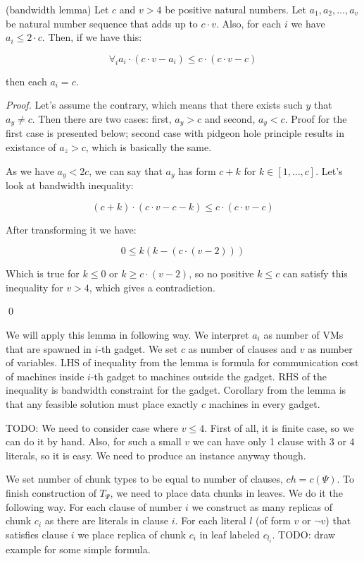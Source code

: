 \begin{lemma} (bandwidth lemma)
Let $c$ and $v > 4$ be positive natural numbers. Let $a_1, a_2, \ldots,
a_v$ be natural number sequence that adds up to $c \cdot v$. Also, for
each $i$ we have $a_i \leq 2 \cdot c$. Then, if we have this:

$$ \forall_i a_i \cdot (c \cdot v - a_i) \leq c \cdot (c \cdot v -
c) $$

then each $a_i = c$.
\end{lemma}
\begin{proof}

Let's assume the contrary, which means that there exists such $y$ that
$a_y \neq c$. Then there are two cases: first, $a_y>c$ and second,
$a_y<c$. Proof for the first case is presented below; second case
with pidgeon hole principle results in existance of $a_z > c$, which
is basically the same.

As we have $a_y < 2c$, we can say that $a_y$ has form $c +
k$ for $k \in [1, \ldots, c]$. Let's look at bandwidth inequality:

$$ (c + k) \cdot (c \cdot v - c - k) \leq c \cdot (c \cdot v - c) $$

After transforming it we have:

$$ 0 \leq k(k - (c \cdot (v - 2))) $$

Which is true for $k \leq 0$ or $k \geq c \cdot (v - 2)$, so no
positive $k \leq c$ can satisfy this inequality for $v > 4$, which gives a contradiction. 

\qed

\end{proof}

We will apply this lemma in following way. We interpret $a_i$ as
number of VMs that are spawned in $i$-th gadget. We set $c$ as number
of clauses and $v$ as number of variables. LHS of inequality from the
lemma is formula for communication cost of machines inside $i$-th
gadget to machines outside the gadget. RHS of the inequality is
bandwidth constraint for the gadget. Corollary from the lemma is that
any feasible solution must place exactly $c$ machines in every gadget.

TODO: We need to consider case where $v \leq 4$. First of all, it is
finite case, so we can do it by hand. Also, for such a small $v$ we
can have only 1 clause with 3 or 4 literals, so it is easy. We need to
produce an instance anyway though.

We set number of chunk types to be equal to number of clauses, $ch =
c(\Psi)$. To finish construction of $T_{\Psi}$, we need to place data chunks in
leaves. We do it the following way. For each clause of number $i$ we
construct as many replicas of chunk $c_i$ as there are literals in
clause $i$. For each literal $l$ (of form $v$ or $\neg v$) that satisfies clause $i$ we place
replica of chunk $c_i$ in leaf labeled $c_{l_i}$. TODO: draw example for
some simple formula.

